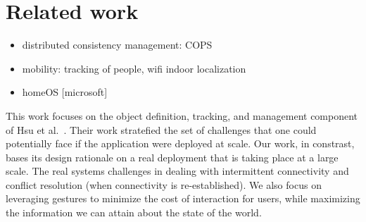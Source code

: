 \section{Related work}

\begin{itemize}
\item distributed consistency management: COPS
\item mobility: tracking of people, wifi indoor localization
\item homeOS [microsoft]
\end{itemize}

This work focuses on the object definition, tracking, and management component of Hsu et al.~\cite{hbci}.  Their
work stratefied the set of challenges that one could potentially face if the application were deployed at scale.  Our
work, in constrast, bases its design rationale on a real deployment that is taking place at a large scale.
The real systems challenges in dealing with intermittent connectivity
and conflict resolution (when connectivity is re-established).  We also focus on leveraging gestures to minimize
the cost of interaction for users, while maximizing the information we can attain about the state of the world.

